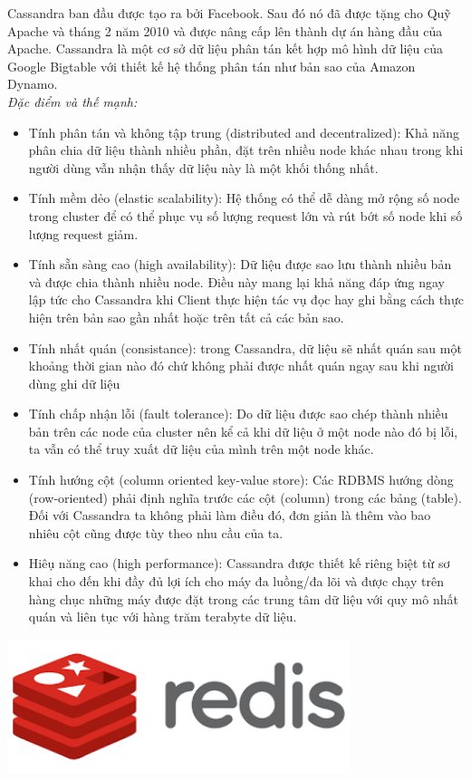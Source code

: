Cassandra ban đầu được tạo ra bởi Facebook. Sau đó nó đã được tặng cho Quỹ Apache và tháng 2 năm 2010 và được nâng cấp lên thành dự án hàng đầu của Apache. Cassandra là một cơ sở dữ liệu phân tán kết hợp mô hình dữ liệu của Google Bigtable với thiết kế hệ thống phân tán như bản sao của Amazon Dynamo.\\

\textit{Đặc điểm và thế mạnh:}
\begin{itemize}
    \item Tính phân tán và không tập trung (distributed and decentralized): Khả năng phân chia dữ liệu thành nhiều phần, đặt trên nhiều node khác nhau trong khi người dùng vẫn nhận thấy dữ liệu này là một khối thống nhất.
    \item Tính mềm dẻo (elastic scalability): Hệ thống có thể dễ dàng mở rộng số node trong cluster để có thể phục vụ số lượng request lớn và rút bớt số node khi số lượng request giảm.
    \item Tính sẵn sàng cao (high availability): Dữ liệu được sao lưu thành nhiều bản và được chia thành nhiều node. Điều này mang lại khả năng đáp ứng ngay lập tức cho Cassandra khi Client thực hiện tác vụ đọc hay ghi bằng cách thực hiện trên bản sao gần nhất hoặc trên tất cả các bản sao.
    \item Tính nhất quán (consistance): trong Cassandra, dữ liệu sẽ nhất quán sau một khoảng thời gian nào đó chứ không phải được nhất quán ngay sau khi người dùng ghi dữ liệu
    \item Tính chấp nhận lỗi (fault tolerance): Do dữ liệu được sao chép thành nhiều bản trên các node của cluster nên kể cả khi dữ liệu ở một node nào đó bị lỗi, ta vẫn có thể truy xuất dữ liệu của mình trên một node khác.
    \item Tính hướng cột (column oriented key-value store): Các RDBMS hướng dòng (row-oriented) phải định nghĩa trước các cột (column) trong các bảng (table). Đối với Cassandra ta không phải làm điều đó, đơn giản là thêm vào bao nhiêu cột cũng được tùy theo nhu cầu của ta.
    \item Hiêụ năng cao (high performance): Cassandra được thiết kế riêng biệt từ sơ khai cho đến khi đầy đủ lợi ích cho máy đa luồng/đa lõi và được chạy trên hàng chục những máy được đặt trong các trung tâm dữ liệu với quy mô nhất quán và liên tục với hàng trăm terabyte dữ liệu.
\end{itemize}
\begin{center}
  \captionsetup{type=figure}
  \includegraphics[width=10cm]{img/redis.png}
\end{center}

